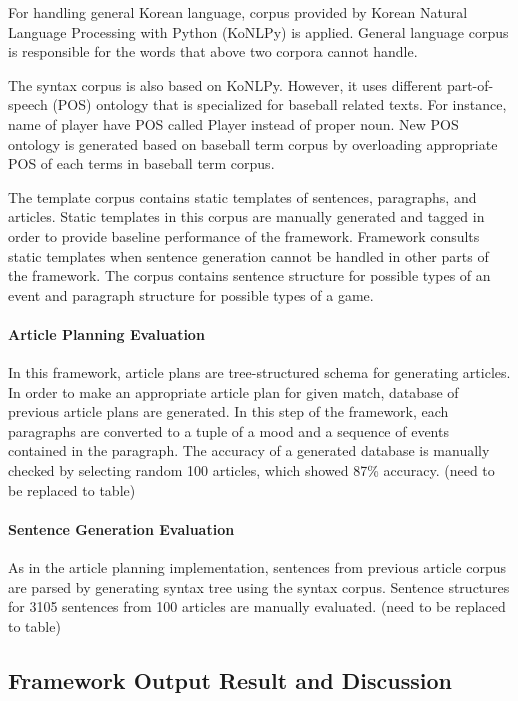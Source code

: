 \documentclass{sig-alternate}
\begin{document}
For handling general Korean language, corpus provided by Korean Natural Language Processing with Python (KoNLPy) is applied. General language corpus is responsible for the words that above two corpora cannot handle. 

The syntax corpus is also based on KoNLPy. However, it uses different part-of-speech (POS) ontology that is specialized for baseball related texts. For instance, name of player have POS called Player instead of proper noun. New POS ontology is generated based on baseball term corpus by overloading appropriate POS of each terms in baseball term corpus. 

The template corpus contains static templates of sentences, paragraphs, and articles. Static templates in this corpus are manually generated and tagged in order to provide baseline performance of the framework. Framework consults static templates when sentence generation cannot be handled in other parts of the framework. The corpus contains sentence structure for possible types of an event and paragraph structure for possible types of a game. 

\paragraph{Article Planning Evaluation}

In this framework, article plans are tree-structured schema for generating articles. In order to make an appropriate article plan for given match, database of previous article plans are generated. In this step of the framework, each paragraphs are converted to a tuple of a mood and a sequence of events contained in the paragraph. The accuracy of a generated database is manually checked by selecting random 100 articles, which showed 87\% accuracy. (need to be replaced to table)

\paragraph{Sentence Generation Evaluation} 

As in the article planning implementation, sentences from previous article corpus are parsed by generating syntax tree using the syntax corpus. Sentence structures for 3105 sentences from 100 articles are manually evaluated. (need to be replaced to table)


\subsection{Framework Output Result and Discussion}
\end{document}
